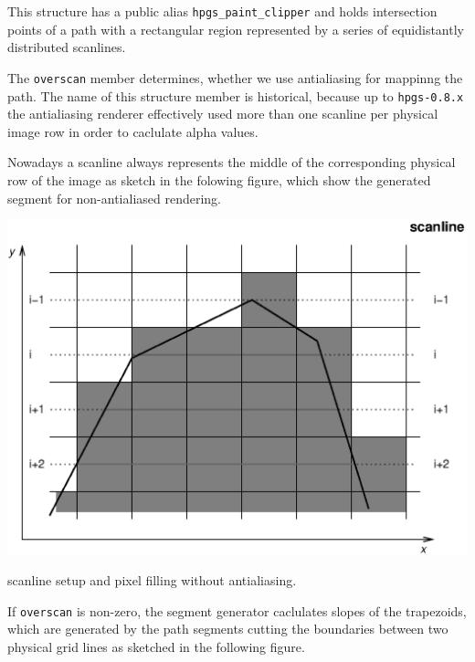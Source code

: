 This structure has a public alias {\tt hpgs\_\-paint\_\-clipper} and holds intersection points of a path with a rectangular region represented by a series of equidistantly distributed scanlines.

The {\tt overscan} member determines, whether we use antialiasing for mappinng the path. The name of this structure member is historical, because up to {\tt hpgs-0.8.x} the antialiasing renderer effectively used more than one scanline per physical image row in order to caclulate alpha values.

Nowadays a scanline always represents the middle of the corresponding physical row of the image as sketch in the folowing figure, which show the generated segment for non-antialiased rendering.

 \begin{Image}
\begin{center}
\includegraphics{scanline_0}\caption{scanline setup and pixel filling without antialiasing.}
\end{center}
\end{Image}
 If {\tt overscan} is non-zero, the segment generator caclulates slopes of the trapezoids, which are generated by the path segments cutting the boundaries between two physical grid lines as sketched in the following figure.

